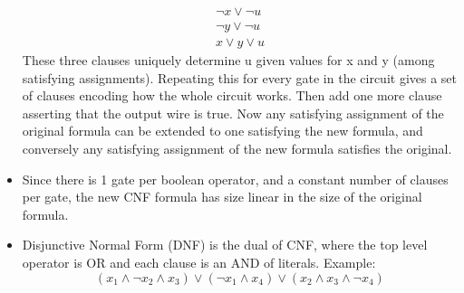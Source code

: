 \documentclass{article}
\begin{document}
\begin{itemize}
\begin{align*}
\neg x \lor \neg u \\
\neg y \lor \neg u \\
x \lor y \lor u
\end{align*}
These three clauses uniquely determine u given values for x and y (among satisfying assignments). Repeating this for every gate in the circuit gives a set of clauses encoding how the whole circuit works. Then add one more clause asserting that the output wire is true. Now any satisfying assignment of the original formula can be extended to one satisfying the new formula, and conversely any satisfying assignment of the new formula satisfies the original.
\item Since there is 1 gate per boolean operator, and a constant number of clauses per gate, the new CNF formula has size linear in the size of the original formula.
\item Disjunctive Normal Form (DNF) is the dual of CNF, where the top level operator is OR and each clause is an AND of literals. Example: \[(x_1 \land \neg x_2 \land x_3) \lor (\neg x_1 \land x_4) \lor (x_2 \land x_3 \land \neg x_4)\]
\end{itemize}
\end{document}
